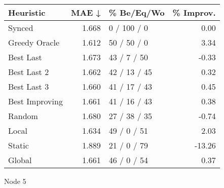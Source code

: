 \begin{tabular}{lrlr}
\toprule
\textbf{Heuristic} & \textbf{MAE ↓} & \textbf{\% Be/Eq/Wo} & \textbf{\% Improv.} \\
\midrule
            Synced &          1.668 &          0 / 100 / 0 &                0.00 \\
     Greedy Oracle &          1.612 &          50 / 50 / 0 &                3.34 \\
         Best Last &          1.673 &          43 / 7 / 50 &               -0.33 \\
       Best Last 2 &          1.662 &         42 / 13 / 45 &                0.32 \\
       Best Last 3 &          1.660 &         41 / 17 / 43 &                0.45 \\
    Best Improving &          1.661 &         41 / 16 / 43 &                0.38 \\
            Random &          1.680 &         27 / 38 / 35 &               -0.74 \\
             Local &          1.634 &          49 / 0 / 51 &                2.03 \\
            Static &          1.889 &          21 / 0 / 79 &              -13.26 \\
            Global &          1.661 &          46 / 0 / 54 &                0.37 \\
\bottomrule
\end{tabular}
\caption{Node 5}
\label{tab:ds_non_lr05_le2_bs4_5}
